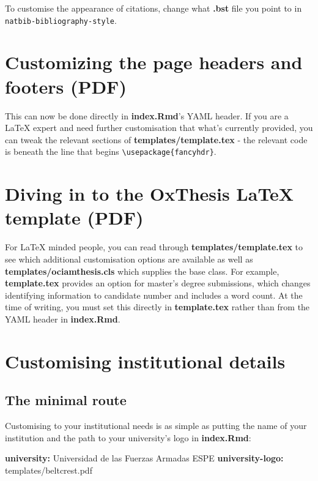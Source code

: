 \documentclass[a4paper, nobind]{templates/ociamthesis}
\newenvironment{Shaded}{\begin{snugshade}}{\end{snugshade}}
\newcommand{\AttributeTok}[1]{\textcolor[rgb]{0.13,0.29,0.53}{#1}}
\newcommand{\FunctionTok}[1]{\textcolor[rgb]{0.13,0.29,0.53}{\textbf{#1}}}
\newcommand{\KeywordTok}[1]{\textcolor[rgb]{0.13,0.29,0.53}{\textbf{#1}}}
\renewenvironment{Shaded}
{
  \vspace{10pt}%
  \begin{snugshade}%
}{%
  \end{snugshade}%
  \vspace{8pt}%
}
\begin{document}
To customise the appearance of citations, change what \textbf{.bst} file you point to in \texttt{natbib-bibliography-style}.

\section{Customizing the page headers and footers (PDF)}\label{customizing-the-page-headers-and-footers-pdf}

This can now be done directly in \textbf{index.Rmd}'s YAML header.
If you are a LaTeX expert and need further customisation that what's currently provided, you can tweak the relevant sections of \textbf{templates/template.tex} - the relevant code is beneath the line that begins \texttt{\textbackslash{}usepackage\{fancyhdr\}}.

\section{Diving in to the OxThesis LaTeX template (PDF)}\label{diving-in-to-the-oxthesis-latex-template-pdf}

For LaTeX minded people, you can read through \textbf{templates/template.tex} to see which additional customisation options are available as well as \textbf{templates/ociamthesis.cls} which supplies the base class.
For example, \textbf{template.tex} provides an option for master's degree submissions, which changes identifying information to candidate number and includes a word count.
At the time of writing, you must set this directly in \textbf{template.tex} rather than from the YAML header in \textbf{index.Rmd}.

\section{Customising institutional details}\label{customising-institutional-details}

\subsection{The minimal route}\label{the-minimal-route}

Customising to your institutional needs is as simple as putting the name of your institution and the path to your university's logo in \textbf{index.Rmd}:

\begin{Shaded}
\begin{Highlighting}[]
\FunctionTok{university}\KeywordTok{:}\AttributeTok{ Universidad de las Fuerzas Armadas ESPE}
\FunctionTok{university{-}logo}\KeywordTok{:}\AttributeTok{ templates/beltcrest.pdf}
\end{Highlighting}
\end{Shaded}
\end{document}
